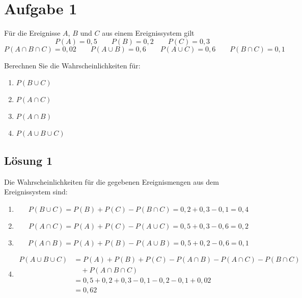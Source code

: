 \documentclass[main.tex]{subfiles}
\begin{document}
\section{Aufgabe 1}
Für die Ereignisse $A$, $B$ und $C$ aus einem Ereignissystem gilt
$$
P(A) = 0,5 \qquad
P(B) = 0,2 \qquad
P(C) = 0,3
$$
$$
P(A\cap B\cap C) = 0,02 \qquad
P(A\cup B) = 0,6 \qquad
P(A\cup C) = 0,6 \qquad
P(B\cap C) = 0,1
$$

Berechnen Sie die Wahrscheinlichkeiten für:
\begin{enumerate}
    \item $P(B\cup C)$
    \item $P(A\cap C)$
    \item $P(A\cap B)$
    \item $P(A\cup B \cup C)$
\end{enumerate}

\subsection{Lösung 1}
Die Wahrscheinlichkeiten für die gegebenen Ereignismengen aus dem Ereignissystem sind:
\begin{enumerate}
    \item $$
        P(B\cup C) = P(B) + P(C) - P(B\cap C) = 0,2 + 0,3 - 0,1 = 0,4
    $$
    \item $$
        P(A\cap C) = P(A) + P(C) - P(A\cup C) = 0,5 + 0,3 - 0,6 = 0,2
    $$
    \item $$
        P(A\cap B) = P(A) + P(B) - P(A\cup B) = 0,5 + 0,2 - 0,6 = 0,1
    $$
    \item $$\begin{aligned}
        P(A\cup B \cup C) &=
        P(A) + P(B) + P(C) - P(A\cap B) - P(A\cap C) - P(B\cap C) \\
        &\quad + P(A\cap B\cap C) \\
        &= 0,5 + 0,2 + 0,3 - 0,1 - 0,2 - 0,1 + 0,02 \\
        &= 0,62
    \end{aligned}$$
\end{enumerate}
\end{document}
